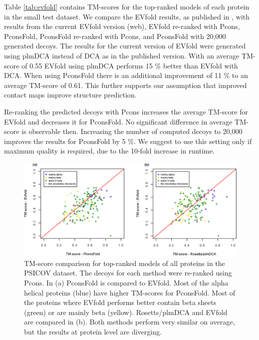 \documentclass{bioinfo}
\begin{document}
Table \ref{tab:evfold} contains TM-scores for the top-ranked models of each protein in the small test dataset. We compare the EVfold results, as published in \citeauthor{marks_protein_2011} \citeyear{marks_protein_2011}, with results from the current EVfold version (web), EVfold re-ranked with Pcons, PconsFold, PconsFold re-ranked with Pcons, and PconsFold with 20,000 generated decoys. The results for the current version of EVfold were generated using plmDCA instead of DCA as in the published version. With an average TM-score of 0.55 EVfold using plmDCA performs 15 \% better than EVfold with DCA. When using PconsFold there is an additional improvement of 11 \% to an average TM-score of 0.61. This further supports our assumption that improved contact maps improve structure prediction. 

Re-ranking the predicted decoys with Pcons increases the average TM-score for EVfold and decreases it for PconsFold. No significant difference in average TM-score is observable then. Increasing the number of computed decoys to 20,000 improves the results for PconsFold by 5 \%. We suggest to use this setting only if maximum quality is required, due to the 10-fold increase in runtime.


\begin{figure}[!tpb]%
\centerline{\includegraphics[scale=0.7]{figures/vs.eps}}
\caption{TM-score comparison for top-ranked models of all proteins in the PSICOV dataset. The decoys for each method were re-ranked using Pcons. In (a) PconsFold is compared to EVfold. Most of the alpha helical proteins (blue) have higher TM-scores for PconsFold. Most of the proteins where EVfold performs better contain beta sheets (green) or are mainly beta (yellow). Rosetts/plmDCA and EVfold are compared in (b). Both methods perform very similar on average, but the results at protein level are diverging.}\label{fig:vs}
\end{figure}
\end{document}
